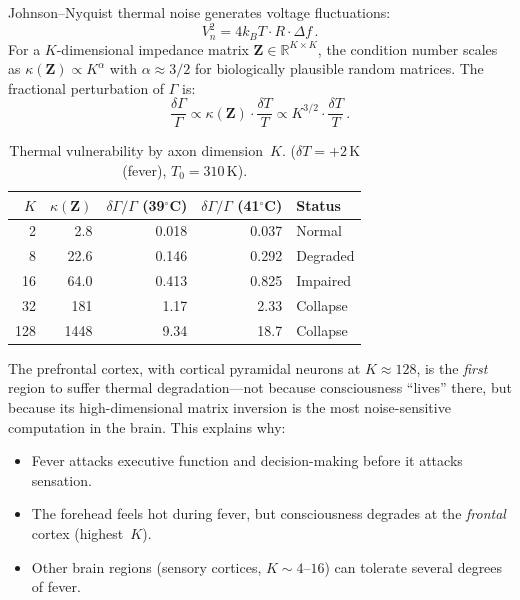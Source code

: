 \documentclass[aps,pre,twocolumn,superscriptaddress,floatfix]{revtex4-2}
\begin{document}
Johnson--Nyquist thermal noise generates voltage fluctuations:
\begin{equation}
  V_n^2 = 4 k_B T \cdot R \cdot \Delta f\,.
  \label{eq:JN}
\end{equation}
For a $K$-dimensional impedance matrix $\mathbf{Z}\in\mathbb{R}^{K\times K}$,
the condition number scales as $\kappa(\mathbf{Z})\propto K^\alpha$
with $\alpha\approx 3/2$ for biologically plausible random matrices.
The fractional perturbation of $\Gamma$ is:
\begin{equation}
  \frac{\delta\Gamma}{\Gamma}
    \propto \kappa(\mathbf{Z}) \cdot \frac{\delta T}{T}
    \propto K^{3/2} \cdot \frac{\delta T}{T}\,.
  \label{eq:thermal-vulnerability}
\end{equation}

\begin{table}[h]
\centering
\caption{Thermal vulnerability by axon dimension~$K$.
($\delta T=+2$\,K (fever), $T_0=310$\,K).}
\label{tab:thermal-K}
\begin{tabular}{@{}rrrrl@{}}
\toprule
$K$ & $\kappa(\mathbf{Z})$ & $\delta\Gamma/\Gamma$ (39$^\circ$C)
    & $\delta\Gamma/\Gamma$ (41$^\circ$C) & Status \\
\midrule
2   & 2.8    & 0.018  & 0.037  & Normal \\
8   & 22.6   & 0.146  & 0.292  & Degraded \\
16  & 64.0   & 0.413  & 0.825  & Impaired \\
32  & 181    & 1.17   & 2.33   & Collapse \\
128 & 1448   & 9.34   & 18.7   & Collapse \\
\bottomrule
\end{tabular}
\end{table}

The prefrontal cortex, with cortical pyramidal neurons at
$K\approx 128$, is the \emph{first} region to suffer thermal
degradation---not because consciousness ``lives'' there, but
because its high-dimensional matrix inversion is the most
noise-sensitive computation in the brain.
This explains why:
\begin{itemize}
  \item Fever attacks executive function and decision-making
    before it attacks sensation.
  \item The forehead feels hot during fever, but consciousness
    degrades at the \emph{frontal} cortex (highest~$K$).
  \item Other brain regions (sensory cortices, $K\sim 4$--$16$)
    can tolerate several degrees of fever.
\end{itemize}
\end{document}
